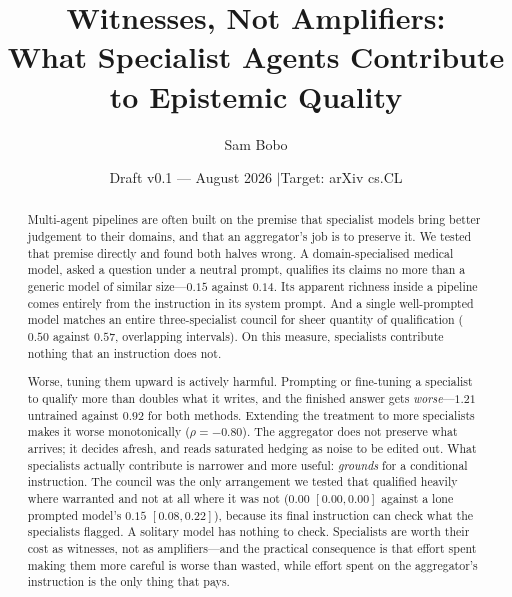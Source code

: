 \documentclass[11pt]{article}
\title{\textbf{Witnesses, Not Amplifiers:\\ What Specialist Agents Contribute to
Epistemic Quality}}
\author{Sam Bobo}
\date{Draft v0.1 --- August 2026 \quad$\vert$\quad Target: arXiv cs.CL}
\begin{document}
\sloppy
\maketitle

\begin{abstract}
\noindent
Multi-agent pipelines are often built on the premise that specialist models
bring better judgement to their domains, and that an aggregator's job is to
preserve it. We tested that premise directly and found both halves wrong. A
domain-specialised medical model, asked a question under a neutral prompt,
qualifies its claims no more than a generic model of similar size---$0.15$
against $0.14$. Its apparent richness inside a pipeline comes entirely from
the instruction in its system prompt. And a single well-prompted model
matches an entire three-specialist council for sheer quantity of qualification
($0.50$ against $0.57$, overlapping intervals). On this measure, specialists
contribute nothing that an instruction does not.

Worse, tuning them upward is actively harmful. Prompting or fine-tuning a
specialist to qualify more than doubles what it writes, and the finished
answer gets \emph{worse}---$1.21$ untrained against $0.92$ for both methods.
Extending the treatment to more specialists makes it worse monotonically
($\rho = -0.80$). The aggregator does not preserve what arrives; it decides
afresh, and reads saturated hedging as noise to be edited out. What
specialists actually contribute is narrower and more useful: \emph{grounds}
for a conditional instruction. The council was the only arrangement we tested
that qualified heavily where warranted and not at all where it was not
($0.00$ $[0.00,0.00]$ against a lone prompted model's $0.15$ $[0.08,0.22]$),
because its final instruction can check what the specialists flagged. A
solitary model has nothing to check. Specialists are worth their cost as
witnesses, not as amplifiers---and the practical consequence is that effort
spent making them more careful is worse than wasted, while effort spent on
the aggregator's instruction is the only thing that pays.
\end{abstract}

\begin{center}
\end{center}
\end{document}
